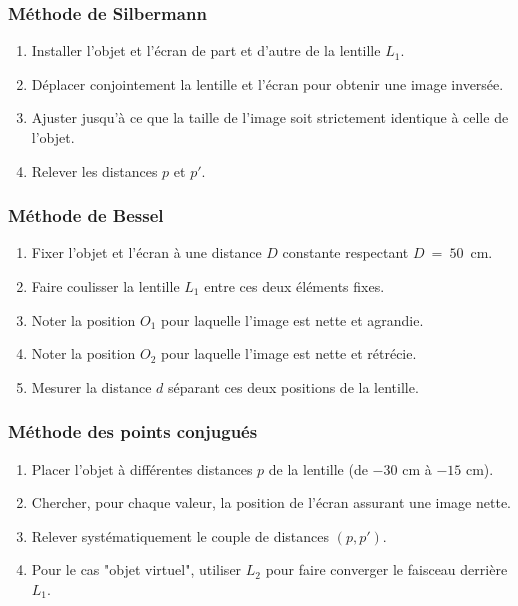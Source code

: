\subsubsection{Méthode de Silbermann}
\begin{enumerate}
    \item Installer l'objet et l'écran de part et d'autre de la lentille $L_1$.
    \item Déplacer conjointement la lentille et l'écran pour obtenir une image inversée.
    \item Ajuster jusqu'à ce que la taille de l'image soit strictement identique à celle de l'objet.
    \item Relever les distances $p$ et $p'$.
\end{enumerate}

\subsubsection{Méthode de Bessel}
\begin{enumerate}
    \item Fixer l'objet et l'écran à une distance $D$ constante respectant $D~=~50$~cm.
    \item Faire coulisser la lentille $L_1$ entre ces deux éléments fixes.
    \item Noter la position $O_1$ pour laquelle l'image est nette et agrandie.
    \item Noter la position $O_2$ pour laquelle l'image est nette et rétrécie.
    \item Mesurer la distance $d$ séparant ces deux positions de la lentille.
\end{enumerate}

\subsubsection{Méthode des points conjugués}
\begin{enumerate}
    \item Placer l'objet à différentes distances $p$ de la lentille (de $-30$ cm à $-15$ cm).
    \item Chercher, pour chaque valeur, la position de l'écran assurant une image nette.
    \item Relever systématiquement le couple de distances $(p, p')$.
    \item Pour le cas "objet virtuel", utiliser $L_2$ pour faire converger le faisceau derrière $L_1$.
\end{enumerate}

